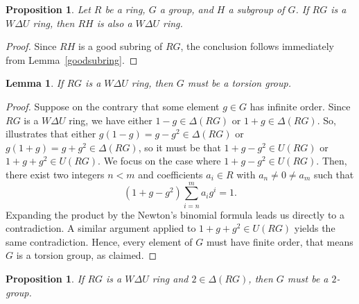 \documentclass[12pt]{amsart}
\newtheorem{proposition}[theorem]{Proposition}
\newtheorem{lemma}[theorem]{Lemma}
\theoremstyle{definition}
\begin{document}
\begin{proposition}
Let \(R\) be a ring, \(G\) a group, and \(H\) a subgroup of \(G\). If \(RG\) is a \(W\Delta U\) ring, then \(RH\) is also a \(W\Delta U\) ring.
\end{proposition}

\begin{proof}
Since \(RH\) is a good subring of \(RG\), the conclusion follows immediately from Lemma~\ref{goodsubring}.
\end{proof}

\begin{lemma}\label{torsion}
If \(RG\) is a \(W\Delta U\) ring, then \(G\) must be a torsion group.
\end{lemma}

\begin{proof}
Suppose on the contrary that some element \(g \in G\) has infinite order. Since \(RG\) is a \(W\Delta U\) ring, we have either \(1 - g \in \Delta(RG)\) or \(1 + g \in \Delta(RG)\). So, \cite[Lemma 2.1(3)]{7} illustrates that either \(g(1 - g)=g-g^2 \in \Delta(RG)\) or \(g(1 +g)=g+g^2 \in \Delta(RG)\), so it must be that \(1 + g - g^2 \in U(RG)\) or \(1 + g + g^2 \in U(RG)\). We focus on the case where \(1 + g - g^2 \in U(RG)\). Then, there exist two integers \(n < m\) and coefficients \(a_i \in R\) with \(a_n \neq 0 \neq a_m\) such that
\[
(1 + g - g^2) \sum_{i=n}^m a_i g^i = 1.
\]
Expanding the product by the Newton's binomial formula leads us directly to a contradiction. A similar argument applied to \(1 + g + g^2 \in U(RG)\) yields the same contradiction. Hence, every element of \(G\) must have finite order, that means \(G\) is a torsion group, as claimed.
\end{proof}

\begin{proposition}\label{torsion2}
If \(RG\) is a \(W\Delta U\) ring and \(2 \in \Delta(RG)\), then \(G\) must be a \(2\)-group.	
\end{proposition}
\end{document}
